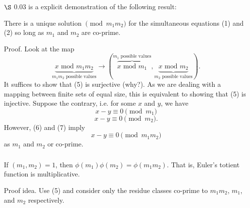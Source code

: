 \documentclass{article}
\begin{document}
\subsubsection{}
$\S$ 0.03 is a explicit demonstration of the following result:
\begin{thm}
    There is a unique solution $\pmod{m_{1}m_{2}}$ for the simultaneous equations (1) and (2) so long as $m_{1}$ and $m_{2}$ are co-prime.
\end{thm}
Proof. Look at the map
\begin{equation}
    \underbrace{x \textrm{ mod } m_{1}m_{2}}_{m_{1}m_{2}\textrm{ possible values}} \rightarrow (\overbrace{x \textrm{ mod } m_{1}}^{m_{1}\textrm{ possible values}}, \underbrace{x \textrm{ mod } m_{2}}_{m_{2}\textrm{ possible values}}).
\end{equation}
It suffices to show that (5) is surjective (why?). As we are dealing with a mapping between finite sets of equal size, this is equivalent to showing that (5) is injective. Suppose the contrary, i.e. for some $x$ and $y$, we have
\begin{equation}
    x-y \equiv 0 \pmod{m_{1}}
\end{equation}
\begin{equation}
    x-y \equiv 0 \pmod{m_{2}}.
\end{equation}
However, (6) and (7) imply
\begin{equation}
    x-y \equiv 0 \pmod{m_{1}m_{2}}
\end{equation}
as $m_{1}$ and $m_{2}$ or co-prime.

\subsubsection{}
\begin{thm}
    If $(m_{1},m_{2}) = 1$, then $\phi(m_{1})\phi(m_{2}) = \phi(m_{1}m_{2})$. That is, Euler's totient function is multiplicative.
\end{thm}
Proof idea. Use (5) and consider only the residue classes co-prime to $m_{1}m_{2}$, $m_{1}$, and $m_{2}$ respectively.
\end{document}
